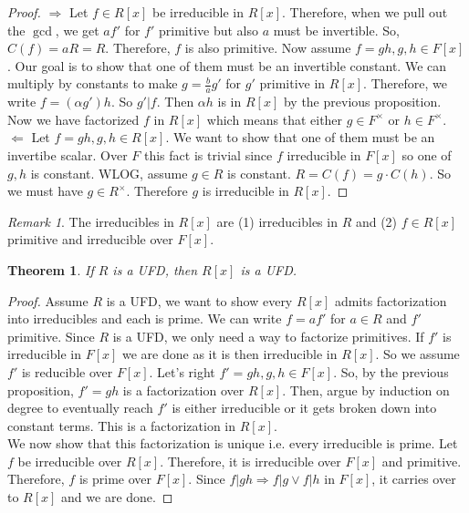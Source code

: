 \documentclass{article}
\newtheorem{theorem}{Theorem}[section]
\theoremstyle{definition}
\theoremstyle{remark}
\newtheorem*{remark}{Remark}
\theoremstyle{plain}
\begin{document}
\begin{proof}
    \(\Rightarrow\) Let \(f \in R[x]\) be irreducible in \(R[x]\). Therefore, when we pull out the \(\gcd\), we get \(af'\) for \(f'\)
    primitive but also \(a\) must be invertible. So, \(C(f) = aR = R\). Therefore, \(f\) is also primitive. Now assume \(f = gh, g,h \in F[x]\). 
    Our goal is to show that one of them must be an invertible constant. We can multiply by constants to make \(g = \frac{b}{a}g'\) for \(g'\) primitive in \(R[x]\).
    Therefore, we write \(f = (\alpha g')h\). So \(g'|f\). Then \(\alpha h\) is in \(R[x]\) by the previous proposition. Now we have factorized \(f\) in \(R[x]\) which means that
    either \(g\in F^{\times}\) or \(h \in F^{\times}\).\\
    \(\Leftarrow\) Let \(f = gh, g,h \in R[x]\). We want to show that one of them must be an invertibe scalar. Over \(F\) this fact is trivial since \(f\)
    irreducible in \(F[x]\) so one of \(g,h\) is constant. WLOG, assume \(g\in R\) is constant. \(R = C(f) = g\cdot C(h)\). So we must have \(g\in R^{\times}\).
    Therefore \(g\) is irreducible in \(R[x]\).
\end{proof}

\begin{remark}
    The irreducibles in \(R[x]\) are (1) irreducibles in \(R\) and (2) \(f \in R[x]\) primitive and irreducible over \(F[x]\).
\end{remark}

\begin{theorem}
    If \(R\) is a UFD, then \(R[x]\) is a UFD. 
\end{theorem}
\begin{proof}
    Assume \(R\) is a UFD, we want to show every \(R[x]\) admits factorization into irreducibles
    and each is prime. We can write \(f = af'\) for \(a \in R\) and \(f'\) primitive. Since \(R\)
    is a UFD, we only need a way to factorize primitives. If \(f'\) is irreducible in \(F[x]\) we are
    done as it is then irreducible in \(R[x]\). So we assume \(f'\) is reducible over \(F[x]\). Let's right
    \(f' = gh, g,h \in F[x]\). So, by the previous proposition, \(f' = gh\) is a factorization over \(R[x]\).
    Then, argue by induction on degree to eventually reach \(f'\) is either irreducible or it gets broken down into
    constant terms. This is a factorization in \(R[x]\).\\
    We now show that this factorization is unique i.e. every irreducible is prime. Let \(f\) be irreducible
    over \(R[x]\). Therefore, it is irreducible over \(F[x]\) and primitive. Therefore, \(f\) is prime over \(F[x]\). 
    Since \(f|gh \Rightarrow f|g \lor f|h\) in \(F[x]\), it carries over to \(R[x]\) and we are done.
\end{proof}
\end{document}
